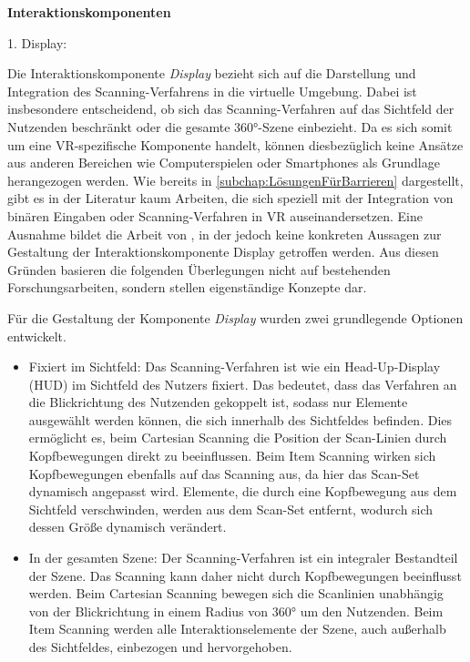 {\normalfont \bfseries Interaktionskomponenten}  

1. Display:

Die Interaktionskomponente \textit{Display} bezieht sich auf die Darstellung und Integration des Scanning-Verfahrens in die virtuelle Umgebung. Dabei ist insbesondere entscheidend, ob sich das Scanning-Verfahren auf das Sichtfeld der Nutzenden beschränkt oder die gesamte 360°-Szene einbezieht. Da es sich somit um eine VR-spezifische Komponente handelt, können diesbezüglich keine Ansätze aus anderen Bereichen wie Computerspielen oder Smartphones als Grundlage herangezogen werden. Wie bereits in \autoref{subchap:LösungenFürBarrieren} dargestellt, gibt es in der Literatur kaum Arbeiten, die sich speziell mit der Integration von binären Eingaben oder Scanning-Verfahren in VR auseinandersetzen. Eine Ausnahme bildet die Arbeit von \citet{valakou_framework_2024}, in der jedoch keine konkreten Aussagen zur Gestaltung der Interaktionskomponente Display getroffen werden. Aus diesen Gründen basieren die folgenden Überlegungen nicht auf bestehenden Forschungsarbeiten, sondern stellen eigenständige Konzepte dar.

Für die Gestaltung der Komponente \textit{Display} wurden zwei grundlegende Optionen entwickelt.

\begin{itemize}
    \item Fixiert im Sichtfeld: Das Scanning-Verfahren ist wie ein Head-Up-Display (HUD) im Sichtfeld des Nutzers fixiert. Das bedeutet, dass das Verfahren an die Blickrichtung des Nutzenden gekoppelt ist, sodass nur Elemente ausgewählt werden können, die sich innerhalb des Sichtfeldes befinden. Dies ermöglicht es, beim Cartesian Scanning die Position der Scan-Linien durch Kopfbewegungen direkt zu beeinflussen. Beim Item Scanning wirken sich Kopfbewegungen ebenfalls auf das Scanning aus, da hier das Scan-Set dynamisch angepasst wird. Elemente, die durch eine Kopfbewegung aus dem Sichtfeld verschwinden, werden aus dem Scan-Set entfernt, wodurch sich dessen Größe dynamisch verändert.
    \item In der gesamten Szene: Der Scanning-Verfahren ist ein integraler Bestandteil der Szene. Das Scanning kann daher nicht durch Kopfbewegungen beeinflusst werden. Beim Cartesian Scanning bewegen sich die Scanlinien unabhängig von der Blickrichtung in einem Radius von 360° um den Nutzenden. Beim Item Scanning werden alle Interaktionselemente der Szene, auch außerhalb des Sichtfeldes, einbezogen und hervorgehoben. 
\end{itemize}

